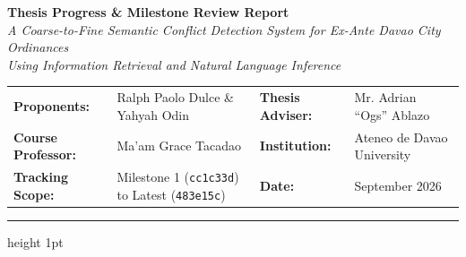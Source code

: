 \documentclass[10pt,letterpaper]{article}
\begin{document}
\begin{center}
    {\huge\bfseries\color{primary} Thesis Progress \& Milestone Review Report}\\[0.3em]
    {\large\itshape\color{secondary} A Coarse-to-Fine Semantic Conflict Detection System for Ex-Ante Davao City Ordinances\\Using Information Retrieval and Natural Language Inference}\\[1.0em]
\end{center}

\vspace{-0.5em}
\noindent\begin{tabularx}{\linewidth}{@{}lXlX@{}}
    \textbf{Proponents:} & Ralph Paolo Dulce \& Yahyah Odin & \textbf{Thesis Adviser:} & Mr. Adrian ``Ogs'' Ablazo \\
    \textbf{Course Professor:} & Ma'am Grace Tacadao & \textbf{Institution:} & Ateneo de Davao University \\
    \textbf{Tracking Scope:} & Milestone 1 (\texttt{cc1c33d}) to Latest (\texttt{483e15c}) & \textbf{Date:} & September 2026 \\
\end{tabularx}
\vspace{0.3em}
\hrule height 1pt
\vspace{0.6em}
\end{document}
